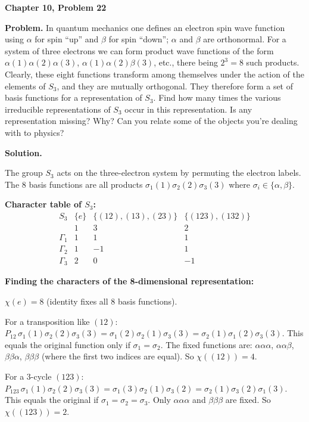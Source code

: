 \documentclass[12pt]{article}
\begin{document}
\begin{center}
{\Large\bfseries Chapter 10, Problem 22}
\end{center}

\noindent\textbf{Problem.} In quantum mechanics one defines an electron spin wave function using $\alpha$ for spin ``up'' and $\beta$ for spin ``down''; $\alpha$ and $\beta$ are orthonormal. For a system of three electrons we can form product wave functions of the form $\alpha(1)\alpha(2)\alpha(3)$, $\alpha(1)\alpha(2)\beta(3)$, etc., there being $2^3 = 8$ such products. Clearly, these eight functions transform among themselves under the action of the elements of $S_3$, and they are mutually orthogonal. They therefore form a set of basis functions for a representation of $S_3$. Find how many times the various irreducible representations of $S_3$ occur in this representation. Is any representation missing? Why? Can you relate some of the objects you're dealing with to physics?

\bigskip
\noindent\textbf{Solution.}

The group $S_3$ acts on the three-electron system by permuting the electron labels. The 8 basis functions are all products $\sigma_1(1)\sigma_2(2)\sigma_3(3)$ where $\sigma_i \in \{\alpha, \beta\}$.

\medskip
\noindent\textbf{Character table of $S_3$:}
\[
\begin{array}{c|ccc}
S_3 & \{e\} & \{(12),(13),(23)\} & \{(123),(132)\} \\
& 1 & 3 & 2 \\
\hline
\Gamma_1 & 1 & 1 & 1 \\
\Gamma_2 & 1 & -1 & 1 \\
\Gamma_3 & 2 & 0 & -1
\end{array}
\]

\noindent\textbf{Finding the characters of the 8-dimensional representation:}

$\chi(e) = 8$ (identity fixes all 8 basis functions).

For a transposition like $(12)$: $P_{12}\,\sigma_1(1)\sigma_2(2)\sigma_3(3) = \sigma_1(2)\sigma_2(1)\sigma_3(3) = \sigma_2(1)\sigma_1(2)\sigma_3(3)$. This equals the original function only if $\sigma_1 = \sigma_2$. The fixed functions are: $\alpha\alpha\alpha$, $\alpha\alpha\beta$, $\beta\beta\alpha$, $\beta\beta\beta$ (where the first two indices are equal). So $\chi((12)) = 4$.

For a 3-cycle $(123)$: $P_{123}\,\sigma_1(1)\sigma_2(2)\sigma_3(3) = \sigma_1(3)\sigma_2(1)\sigma_3(2) = \sigma_2(1)\sigma_3(2)\sigma_1(3)$. This equals the original if $\sigma_1 = \sigma_2 = \sigma_3$. Only $\alpha\alpha\alpha$ and $\beta\beta\beta$ are fixed. So $\chi((123)) = 2$.
\end{document}
